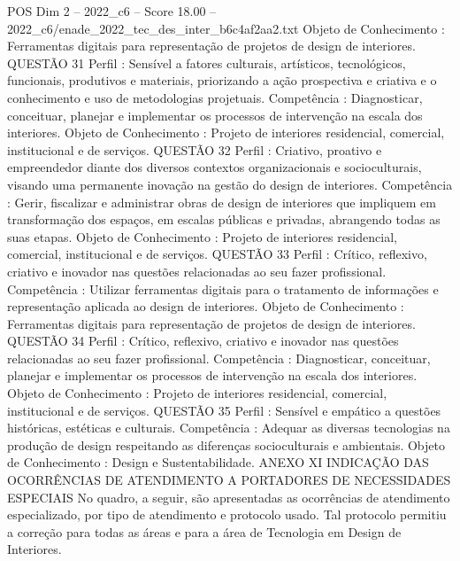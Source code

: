 \begin{textsample}{POS Dim 2 – 2022\_c6 – Score 18.00 – 2022\_c6/enade\_2022\_tec\_des\_inter\_b6c4af2aa2.txt}
Objeto de Conhecimento : Ferramentas digitais para representação de projetos de design de interiores.
QUESTÃO 31 Perfil : Sensível a fatores culturais, artísticos, tecnológicos, funcionais, produtivos e materiais, priorizando a ação prospectiva e criativa e o conhecimento e uso de metodologias projetuais.
Competência : Diagnosticar, conceituar, planejar e implementar os processos de intervenção na escala dos interiores.
Objeto de Conhecimento : Projeto de interiores residencial, comercial, institucional e de serviços.
QUESTÃO 32 Perfil : Criativo, proativo e empreendedor diante dos diversos contextos organizacionais e socioculturais, visando uma permanente inovação na gestão do design de interiores.
Competência : Gerir, fiscalizar e administrar obras de design de interiores que impliquem em transformação dos espaços, em escalas públicas e privadas, abrangendo todas as suas etapas.
Objeto de Conhecimento : Projeto de interiores residencial, comercial, institucional e de serviços.
QUESTÃO 33 Perfil : Crítico, reflexivo, criativo e inovador nas questões relacionadas ao seu fazer profissional.
Competência : Utilizar ferramentas digitais para o tratamento de informações e representação aplicada ao design de interiores.
Objeto de Conhecimento : Ferramentas digitais para representação de projetos de design de interiores.
QUESTÃO 34 Perfil : Crítico, reflexivo, criativo e inovador nas questões relacionadas ao seu fazer profissional.
Competência : Diagnosticar, conceituar, planejar e implementar os processos de intervenção na escala dos interiores.
Objeto de Conhecimento : Projeto de interiores residencial, comercial, institucional e de serviços.
QUESTÃO 35 Perfil : Sensível e empático a questões históricas, estéticas e culturais.
Competência : Adequar as diversas tecnologias na produção de design respeitando as diferenças socioculturais e ambientais.
Objeto de Conhecimento : Design e Sustentabilidade.
ANEXO XI INDICAÇÃO DAS OCORRÊNCIAS DE ATENDIMENTO A PORTADORES DE NECESSIDADES ESPECIAIS No quadro, a seguir, são apresentadas as ocorrências de atendimento especializado, por tipo de atendimento e protocolo usado.
Tal protocolo permitiu a correção para todas as áreas e para a área de Tecnologia em Design de Interiores.

\end{textsample}
